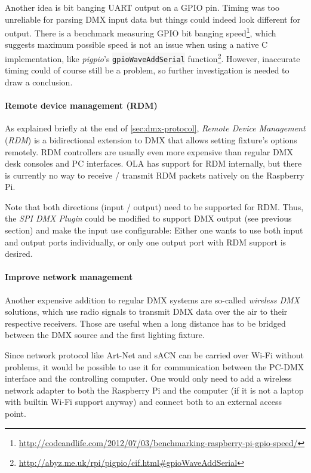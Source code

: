 Another idea is bit banging UART output on a GPIO pin. Timing was too
unreliable for parsing DMX input data but things could indeed look
different for output. There is a benchmark measuring GPIO bit banging
speed\footnote{\url{http://codeandlife.com/2012/07/03/benchmarking-raspberry-pi-gpio-speed/}},
which suggests maximum possible speed is not an issue when using a
native C implementation, like \emph{pigpio}'s
\colorbox{WhiteSmoke}{\lstinline!gpioWaveAddSerial!} function\footnote{\url{http://abyz.me.uk/rpi/pigpio/cif.html\#gpioWaveAddSerial}}.
However, inaccurate timing could of course still be a problem, so
further investigation is needed to draw a conclusion.

\paragraph{Remote device management
(RDM)}\label{remote-device-management-rdm}

As explained briefly at the end of \cref{sec:dmx-protocol}, \emph{Remote
Device Management} (\emph{RDM}) is a bidirectional extension to DMX that
allows setting fixture's options remotely. RDM controllers are usually
even more expensive than regular DMX desk consoles and PC interfaces.
OLA has support for RDM internally, but there is currently no way to
receive / transmit RDM packets natively on the Raspberry Pi.

Note that both directions (input / output) need to be supported for RDM.
Thus, the \emph{SPI DMX Plugin} could be modified to support DMX output
(see previous section) and make the input use configurable: Either one
wants to use both input and output ports individually, or only one
output port with RDM support is desired.

\paragraph{Improve network management}\label{improve-network-management}

Another expensive addition to regular DMX systems are so-called
\emph{wireless DMX} solutions, which use radio signals to transmit DMX
data over the air to their respective receivers. Those are useful when a
long distance has to be bridged between the DMX source and the first
lighting fixture.

Since network protocol like Art-Net and sACN can be carried over Wi-Fi
without problems, it would be possible to use it for communication
between the PC-DMX interface and the controlling computer. One would
only need to add a wireless network adapter to both the Raspberry Pi and
the computer (if it is not a laptop with builtin Wi-Fi support anyway)
and connect both to an external access point.

